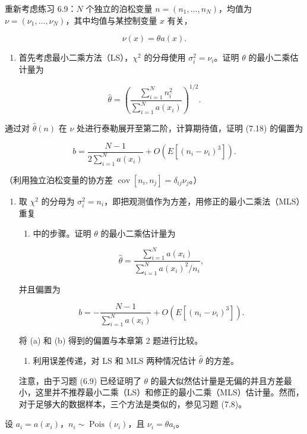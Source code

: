 \begin{question}
重新考虑练习 6.9：\(N\) 个独立的泊松变量 \(n=(n_1,\ldots,n_N)\)，均值为
\(\nu=(\nu_1,\ldots,\nu_N)\)，其中均值与某控制变量 \(x\) 有关，

\[
\nu(x)=\theta a(x).
\]

\begin{enumerate}
\item
  首先考虑最小二乘方法（LS），\(\chi^2\) 的分母使用
  \(\sigma_i^2=\nu_i\)。证明 \(\theta\) 的最小二乘估计量为
\end{enumerate}

\[
\hat\theta=\left(\frac{\sum_{i=1}^{N}n_i^2}{\sum_{i=1}^{N}a(x_i)}\right)^{1/2}.
\]

通过对 \(\hat\theta(n)\) 在 \(\nu\)
处进行泰勒展开至第二阶，计算期待值，证明 (7.18) 的偏置为

\[
b=\frac{N-1}{2\sum_{i=1}^{N}a(x_i)}+O(E[(n_i-\nu_i)^3]).
\]

（利用独立泊松变量的协方差
\(\operatorname{cov}[n_i,n_j]=\delta_{ij}\nu_j\)。）

\begin{enumerate}[start=2]
\item
  取 \(\chi^2\) 的分母为
  \(\sigma_i^2=n_i\)，即把观测值作为方差，用修正的最小二乘法（MLS）重复
\begin{enumerate}
\item 中的步骤。证明 \(\theta\) 的最小二乘估计量为
\end{enumerate}

\[
\hat\theta=\frac{\sum_{i=1}^{N}a(x_i)}{\sum_{i=1}^{N}a(x_i)^2/n_i},
\]

并且偏置为

\[
b=-\frac{N-1}{\sum_{i=1}^{N}a(x_i)}+O(E[(n_i-\nu_i)^3]).
\]

将 (a) 和 (b) 得到的偏置与本章第 2 题进行比较。

\begin{enumerate}[start=3]
\item
  利用误差传递，对 LS 和 MLS 两种情况估计 \(\hat\theta\) 的方差。
\end{enumerate}

注意，由于习题 (6.9) 已经证明了 \(\theta\)
的最大似然估计量是无偏的并且方差最小，这里并不推荐最小二乘（LS）和修正的最小二乘（MLS）估计量。然而，对于足够大的数据样本，三个方法是类似的，参见习题
(7.8)。
\end{enumerate}
\begin{solution}
设 \(a_i=a(x_i)\)，\(n_i\sim\operatorname{Pois}(\nu_i)\)，且
\(\nu_i=\theta a_i\)。


\end{solution}
\end{question}
